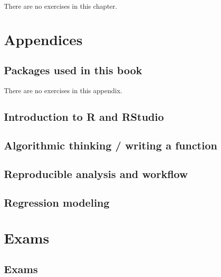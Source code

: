 \documentclass[oneside]{book}
\numberwithin{Answer}{chapter}
\numberwithin{Exercise}{chapter}
\begin{document}
There are no exercises in this chapter.

\appendix
\part{Appendices}

\chapter{Packages used in this book}

There are no exercises in this appendix.

\chapter{Introduction to R and RStudio}


\chapter{Algorithmic thinking / writing a function}


\chapter{Reproducible analysis and workflow}


\chapter{Regression modeling}


\part{Exams}
\chapter{Exams}


\end{document}

